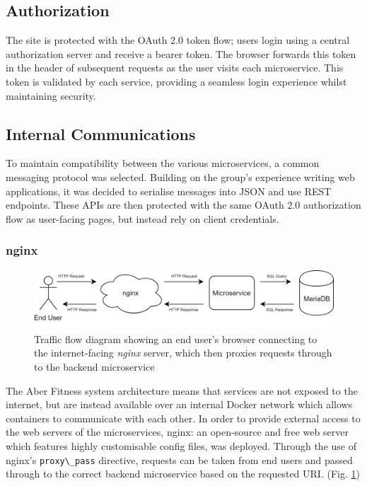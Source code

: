 \subsection{Authorization}
    \par
    The site is protected with the OAuth 2.0 token flow; users login using a central authorization server and receive a bearer token. The browser forwards this token in the header of subsequent requests as the user visits each microservice. This token is validated by each service, providing a seamless login experience whilst maintaining security.

\subsection{Internal Communications}
    \par
    To maintain compatibility between the various microservices, a common messaging protocol was selected. Building on the group's experience writing web applications, it was decided to serialise messages into JSON and use REST endpoints. These APIs are then protected with the same OAuth 2.0 authorization flow as user-facing pages, but instead rely on client credentials.

\subsubsection{nginx}
    \begin{figure}[H]
        \centering
        \includegraphics[width=\textwidth]{Images/nginx_proxy_flow.png}
        \caption{Traffic flow diagram showing an end user's browser connecting to the internet-facing \textit{nginx} server, which then proxies requests through to the backend microservice}
        \label{fig:nginx_proxy_flow}
    \end{figure}
    
    The Aber Fitness system architecture means that services are not exposed to the internet, but are instead available over an internal Docker network which allows containers to communicate with each other. In order to provide external access to the web servers of the microservices, nginx: an open-source and free web server which features highly customisable config files, was deployed. Through the use of nginx's \lstinline{proxy\_pass} directive, requests can be taken from end users and passed through to the correct backend microservice based on the requested URI. (Fig. \ref{fig:nginx_proxy_flow})
    

